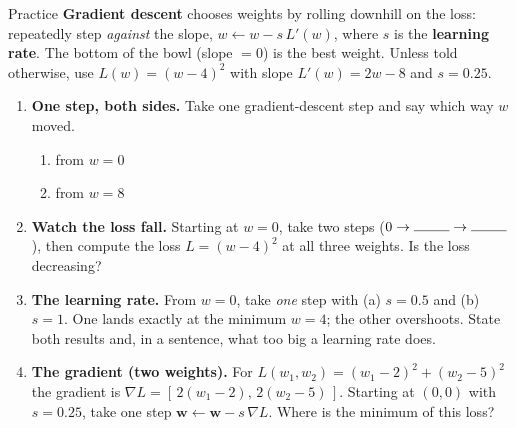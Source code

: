 \documentclass[10pt]{article}
\newcommand{\ww}{\mathbf{w}}
\begin{document}
\namedateperiod

\vspace{0.12in}

\begin{notesbox}{Practice}
\textbf{Gradient descent} chooses weights by rolling downhill on the loss: repeatedly step \emph{against} the
slope, $w\leftarrow w-s\,L'(w)$, where $s$ is the \textbf{learning rate}. The bottom of the bowl (slope $=0$)
is the best weight. Unless told otherwise, use $L(w)=(w-4)^2$ with slope $L'(w)=2w-8$ and $s=0.25$.

\begin{enumerate}[leftmargin=1.9em, itemsep=11pt]
  \item \textbf{One step, both sides.} Take one gradient-descent step and say which way $w$ moved.
    \begin{enumerate}[label=(\alph*), leftmargin=1.8em, itemsep=4pt]
      \item from $w=0$ \hfill {}
      \item from $w=8$ \hfill {}
    \end{enumerate}
  \item \textbf{Watch the loss fall.} Starting at $w=0$, take two steps ($0\to\rule{0.9cm}{0.4pt}\to\rule{0.9cm}{0.4pt}$),
        then compute the loss $L=(w-4)^2$ at all three weights. Is the loss decreasing? 
  \item \textbf{The learning rate.} From $w=0$, take \emph{one} step with (a) $s=0.5$ and (b) $s=1$. One lands
        exactly at the minimum $w=4$; the other overshoots. State both results and, in a sentence, what too big
        a learning rate does. 
  \item \textbf{The gradient (two weights).} For $L(w_1,w_2)=(w_1-2)^2+(w_2-5)^2$ the gradient is
        $\nabla L=[\,2(w_1-2),\,2(w_2-5)\,]$. Starting at $(0,0)$ with $s=0.25$, take one step
        $\ww\leftarrow\ww-s\,\nabla L$. Where is the minimum of this loss? 

\end{enumerate}
\end{notesbox}
\end{document}
